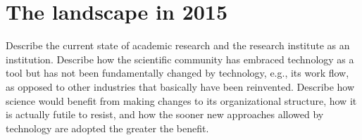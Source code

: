 \section{The landscape in 2015}
Describe the current state of academic research and the research institute as an institution. Describe how the scientific community has embraced technology as a tool but has not been fundamentally changed by technology, e.g., its work flow, as opposed to other industries that basically have been reinvented. Describe how science would benefit from making changes to its organizational structure, how it is actually futile to resist, and how the sooner new approaches allowed by technology are adopted the greater the benefit.